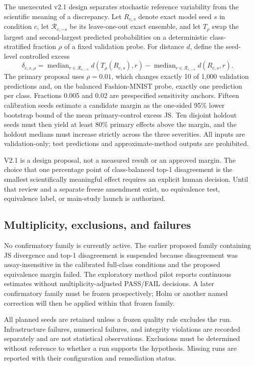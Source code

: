 The unexecuted v2.1 design separates stochastic reference variability from the scientific
meaning of a discrepancy.  Let $R_{c,s}$ denote exact model seed $s$ in condition $c$, let
$\mathcal{R}_{c,-s}$ be its leave-one-out exact ensemble, and let $T_{\rho}$ swap the largest
and second-largest predicted probabilities on a deterministic class-stratified fraction
$\rho$ of a fixed validation probe.  For distance $d$, define the seed-level controlled excess
\begin{equation}
  \delta_{c,s,\rho} =
  \operatorname{median}_{r\in\mathcal{R}_{c,-s}} d(T_{\rho}(R_{c,s}),r)
  - \operatorname{median}_{r\in\mathcal{R}_{c,-s}} d(R_{c,s},r).
\end{equation}
The primary proposal uses $\rho=0.01$, which changes exactly 10 of 1,000 validation predictions
and, on the balanced Fashion-MNIST probe, exactly one prediction per class.  Fractions 0.005
and 0.02 are prespecified sensitivity anchors.  Fifteen calibration seeds estimate a candidate
margin as the one-sided 95\% lower bootstrap bound of the mean primary-control excess JS.
Ten disjoint holdout seeds must then yield at least 80\% primary effects above the margin, and
the holdout medians must increase strictly across the three severities.  All inputs are
validation-only; test predictions and approximate-method outputs are prohibited.

V2.1 is a design proposal, not a measured result or an approved margin.  The choice that one
percentage point of class-balanced top-1 disagreement is the smallest scientifically meaningful
effect requires an explicit human decision.  Until that review and a separate freeze amendment
exist, no equivalence test, equivalence label, or main-study launch is authorized.

\subsection{Multiplicity, exclusions, and failures}
No confirmatory family is currently active. The earlier proposed family containing JS
divergence and top-1 disagreement is suspended because disagreement was assay-insensitive
in the calibrated full-class conditions and the proposed equivalence margin failed. The
exploratory method pilot reports continuous estimates without multiplicity-adjusted
PASS/FAIL decisions. A later confirmatory family must be frozen prospectively; Holm or
another named correction will then be applied within that frozen family.

All planned seeds are retained unless a frozen quality rule excludes the run.
Infrastructure failures, numerical failures, and integrity violations are recorded
separately and are not statistical observations.  Exclusions must be determined without
reference to whether a run supports the hypothesis.  Missing runs are reported with their
configuration and remediation status.

